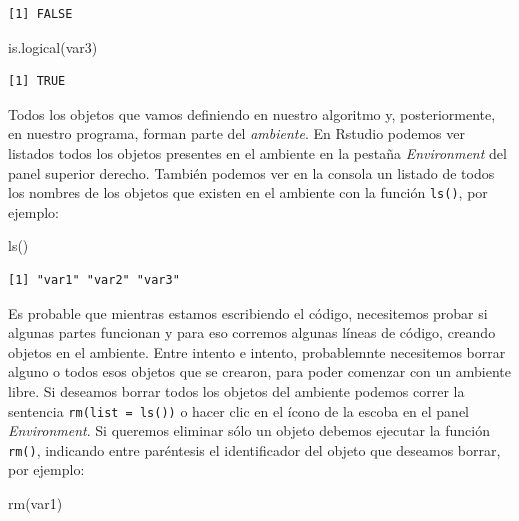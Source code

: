 \documentclass[
]{book}
\newenvironment{Shaded}{\begin{snugshade}}{\end{snugshade}}
\newcommand{\FunctionTok}[1]{\textcolor[rgb]{0.00,0.00,0.00}{#1}}
\newcommand{\NormalTok}[1]{#1}
\begin{document}
\begin{verbatim}
[1] FALSE
\end{verbatim}

\begin{Shaded}
\begin{Highlighting}[]
\FunctionTok{is.logical}\NormalTok{(var3)}
\end{Highlighting}
\end{Shaded}

\begin{verbatim}
[1] TRUE
\end{verbatim}

Todos los objetos que vamos definiendo en nuestro algoritmo y, posteriormente, en nuestro programa, forman parte del \emph{ambiente}. En Rstudio podemos ver listados todos los objetos presentes en el ambiente en la pestaña \emph{Environment} del panel superior derecho. También podemos ver en la consola un listado de todos los nombres de los objetos que existen en el ambiente con la función \texttt{ls()}, por ejemplo:

\begin{Shaded}
\begin{Highlighting}[]
\FunctionTok{ls}\NormalTok{()}
\end{Highlighting}
\end{Shaded}

\begin{verbatim}
[1] "var1" "var2" "var3"
\end{verbatim}

Es probable que mientras estamos escribiendo el código, necesitemos probar si algunas partes funcionan y para eso corremos algunas líneas de código, creando objetos en el ambiente. Entre intento e intento, probablemnte necesitemos borrar alguno o todos esos objetos que se crearon, para poder comenzar con un ambiente libre. Si deseamos borrar todos los objetos del ambiente podemos correr la sentencia \texttt{rm(list\ =\ ls())} o hacer clic en el ícono de la escoba en el panel \emph{Environment}. Si queremos eliminar sólo un objeto debemos ejecutar la función \texttt{rm()}, indicando entre paréntesis el identificador del objeto que deseamos borrar, por ejemplo:

\begin{Shaded}
\begin{Highlighting}[]
\FunctionTok{rm}\NormalTok{(var1)}
\end{Highlighting}
\end{Shaded}
\end{document}
